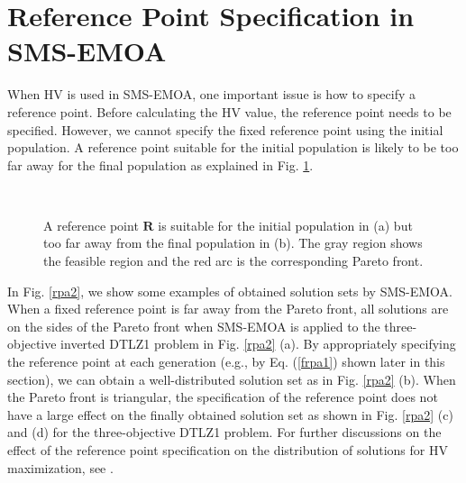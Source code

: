 \documentclass[conference]{IEEEtran}
\begin{document}
\section{Reference Point Specification in SMS-EMOA}
When HV is used in SMS-EMOA, 
one important issue is how to specify a reference point.
Before calculating the HV value, the reference point needs to be specified.
However, we cannot specify the fixed reference point using the initial population. 
A reference point suitable for the initial population is likely to be too far away 
for the final population as explained in Fig. \ref{rpa1}. 

\begin{figure}[!t]
  \centering
  \quad
  \\
  \caption{A reference point $\boldsymbol R$ is suitable for the initial population in (a) 
  but too far away from the final population in (b).
  The gray region shows the feasible region and the red arc is the corresponding Pareto front.}
  \label{rpa1}
\end{figure}

In Fig. \ref{rpa2}, we show some examples of obtained solution sets by SMS-EMOA. 
When a fixed reference point is far away from the Pareto front, 
all solutions are on the sides of the Pareto front when SMS-EMOA is 
applied to the three-objective inverted DTLZ1 problem \cite{invertedDTLZ1} in Fig. \ref{rpa2} (a). 
By appropriately specifying the reference point at each generation 
(e.g., by Eq. (\ref{frpa1}) shown later in this section), 
we can obtain a well-distributed solution set as in Fig. \ref{rpa2} (b). 
When the Pareto front is triangular, 
the specification of the reference point does not have a large effect 
on the finally obtained solution set as shown in Fig. \ref{rpa2} (c) and (d) for the three-objective DTLZ1 problem. 
For further discussions on the effect of the reference point specification 
on the distribution of solutions for HV maximization, see \cite{hisao:RPexplanation, hisao:RPspecify, hisao:dynamic}.
\end{document}

